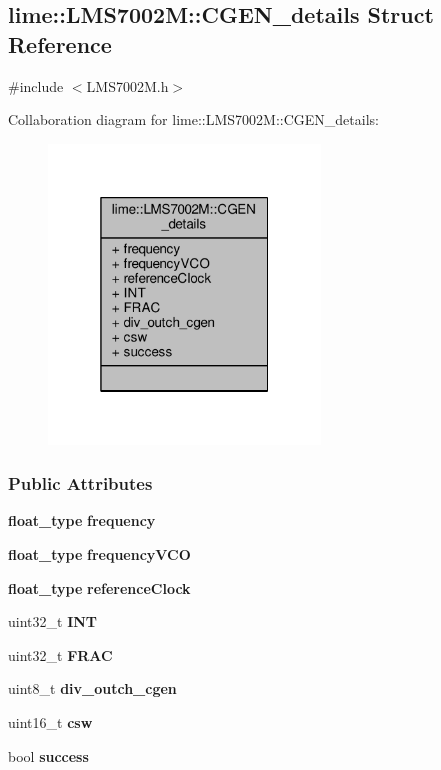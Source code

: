 \subsection{lime\+:\+:L\+M\+S7002M\+:\+:C\+G\+E\+N\+\_\+details Struct Reference}
\label{structlime_1_1LMS7002M_1_1CGEN__details}


{\ttfamily \#include $<$L\+M\+S7002\+M.\+h$>$}



Collaboration diagram for lime\+:\+:L\+M\+S7002M\+:\+:C\+G\+E\+N\+\_\+details\+:
\nopagebreak
\begin{figure}[H]
\begin{center}
\leavevmode
\includegraphics[width=205pt]{de/dd9/structlime_1_1LMS7002M_1_1CGEN__details__coll__graph}
\end{center}
\end{figure}
\subsubsection*{Public Attributes}
\begin{DoxyCompactItemize}
\item 
{\bf float\+\_\+type} {\bf frequency}
\item 
{\bf float\+\_\+type} {\bf frequency\+V\+CO}
\item 
{\bf float\+\_\+type} {\bf reference\+Clock}
\item 
uint32\+\_\+t {\bf I\+NT}
\item 
uint32\+\_\+t {\bf F\+R\+AC}
\item 
uint8\+\_\+t {\bf div\+\_\+outch\+\_\+cgen}
\item 
uint16\+\_\+t {\bf csw}
\item 
bool {\bf success}
\end{DoxyCompactItemize}


